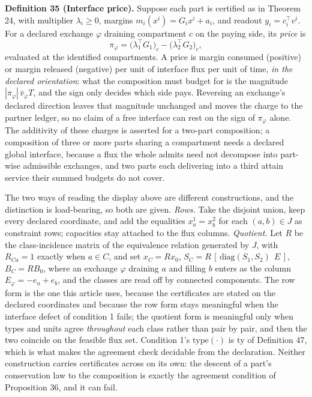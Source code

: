 \documentclass[11pt]{article}
\begin{document}
\textbf{Definition 35 (Interface price).} Suppose each part is certified as in Theorem 24, with multiplier
\(\lambda_i \ge 0\), margins \(m_i(x^i) = G_i x^i + a_i\), and readout \(y_i = c_i^{\top} v^i\). For a
declared exchange \(\varphi\) draining compartment \(c\) on the paying side, its \emph{price} is
\[
\pi_\varphi = \bigl(\lambda_1^{\top} G_1\bigr)_c - \bigl(\lambda_2^{\top} G_2\bigr)_c ,
\]
evaluated at the identified compartments. A price is margin consumed (positive) or margin released (negative) per unit of interface flux per
unit of time, \emph{in the declared orientation}: what the composition must budget for is the magnitude
\(|\pi_\varphi|\,\bar v_\varphi T\), and the sign only decides which side pays. Reversing an exchange's
declared direction leaves that magnitude unchanged and moves the charge to the partner ledger, so no claim
of a free interface can rest on the sign of \(\pi_\varphi\) alone. The additivity of these charges is
asserted for a two-part composition; a composition of three or more parts sharing a compartment needs a
declared global interface, because a flux the whole admits need not decompose into part-wise admissible
exchanges, and two parts each delivering into a third attain service their summed budgets do not cover.

The two ways of reading the display above are different constructions, and the distinction is
load-bearing, so both are given. \emph{Rows.} Take the disjoint union, keep every declared coordinate, and add the
equalities \(x_a^1 = x_b^2\) for each \((a,b) \in J\) as constraint rows; capacities stay attached to the flux
columns. \emph{Quotient.} Let \(R\) be the class-incidence matrix of the equivalence relation generated by \(J\), with
\(R_{Ca} = 1\) exactly when \(a \in C\), and set \(x_C = R x_0\), \(S_C = R\,[\,\mathrm{diag}(S_1, S_2)\ \ E\,]\),
\(B_C = R B_0\), where an exchange \(\varphi\) draining \(a\) and filling \(b\) enters as the column
\(E_\varphi = -e_a + e_b\), and the classes are read off by connected components. The row form is the one this
article uses, because the certificates are stated on the declared coordinates and because the row form stays
meaningful when the interface defect of condition 1 fails; the quotient form is meaningful only when types and
units agree \emph{throughout} each class rather than pair by pair, and then the two coincide on the feasible
flux set. Condition 1's \(\mathrm{type}(\cdot)\) is \(\mathrm{ty}\) of Definition 47, which is what makes the
agreement check decidable from the declaration. Neither construction carries certificates across on its own:
the descent of a part's conservation law to the composition is exactly the agreement condition of
Proposition 36, and it can fail.
\end{document}
